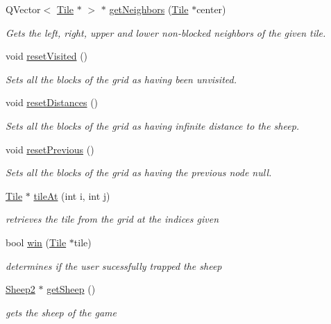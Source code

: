 \begin{DoxyCompactItemize}
\-Q\-Vector$<$ \hyperlink{classTile}{\-Tile} $\ast$ $>$ $\ast$ \hyperlink{classGame2Scene_acd18cc2afd6f91be8fdd083c92ca100b}{get\-Neighbors} (\hyperlink{classTile}{\-Tile} $\ast$center)
\begin{DoxyCompactList}\small\item\em \-Gets the left, right, upper and lower non-\/blocked neighbors of the given tile. \end{DoxyCompactList}\item 
void \hyperlink{classGame2Scene_a898d10c9a3030265ab2352ec5e914706}{reset\-Visited} ()
\begin{DoxyCompactList}\small\item\em \-Sets all the blocks of the grid as having been unvisited. \end{DoxyCompactList}\item 
void \hyperlink{classGame2Scene_ace98f73655b3dc8ed1ea9ebe842e583c}{reset\-Distances} ()
\begin{DoxyCompactList}\small\item\em \-Sets all the blocks of the grid as having infinite distance to the sheep. \end{DoxyCompactList}\item 
void \hyperlink{classGame2Scene_a23a62e1bbf7e658c1bbc492011d9785b}{reset\-Previous} ()
\begin{DoxyCompactList}\small\item\em \-Sets all the blocks of the grid as having the previous node null. \end{DoxyCompactList}\item 
\hyperlink{classTile}{\-Tile} $\ast$ \hyperlink{classGame2Scene_a6e41f95c3cd53553076445ee42771b17}{tile\-At} (int i, int j)
\begin{DoxyCompactList}\small\item\em retrieves the tile from the grid at the indices given \end{DoxyCompactList}\item 
bool \hyperlink{classGame2Scene_ac67be84c6e44a47a4c6cfb914e6ad8b4}{win} (\hyperlink{classTile}{\-Tile} $\ast$tile)
\begin{DoxyCompactList}\small\item\em determines if the user sucessfully trapped the sheep \end{DoxyCompactList}\item 
\hyperlink{classSheep2}{\-Sheep2} $\ast$ \hyperlink{classGame2Scene_a18f8818b0aa1b4f62db76a46ef0a4264}{get\-Sheep} ()
\begin{DoxyCompactList}\small\item\em gets the sheep of the game \end{DoxyCompactList}\item 

\end{DoxyCompactItemize}
